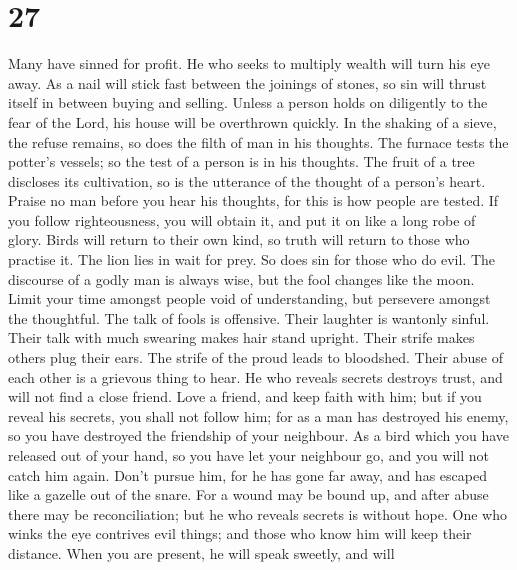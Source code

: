 \hypertarget{section-23}{%
\section{27}\label{section-23}}

 Many have sinned for profit. He who seeks to multiply
wealth will turn his eye away.  As a nail will stick fast
between the joinings of stones, so sin will thrust itself in between
buying and selling.  Unless a person holds on diligently to
the fear of the Lord, his house will be overthrown quickly. 
In the shaking of a sieve, the refuse remains, so does the filth of man
in his thoughts.  The furnace tests the potter's vessels; so
the test of a person is in his thoughts.  The fruit of a
tree discloses its cultivation, so is the utterance of the thought of a
person's heart.  Praise no man before you hear his thoughts,
for this is how people are tested.  If you follow
righteousness, you will obtain it, and put it on like a long robe of
glory.  Birds will return to their own kind, so truth will
return to those who practise it.  The lion lies in wait for
prey. So does sin for those who do evil.  The discourse of
a godly man is always wise, but the fool changes like the moon.
 Limit your time amongst people void of understanding, but
persevere amongst the thoughtful.  The talk of fools is
offensive. Their laughter is wantonly sinful.  Their talk
with much swearing makes hair stand upright. Their strife makes others
plug their ears.  The strife of the proud leads to
bloodshed. Their abuse of each other is a grievous thing to hear.
 He who reveals secrets destroys trust, and will not find a
close friend.  Love a friend, and keep faith with him; but
if you reveal his secrets, you shall not follow him;  for
as a man has destroyed his enemy, so you have destroyed the friendship
of your neighbour.  As a bird which you have released out
of your hand, so you have let your neighbour go, and you will not catch
him again.  Don't pursue him, for he has gone far away, and
has escaped like a gazelle out of the snare.  For a wound
may be bound up, and after abuse there may be reconciliation; but he who
reveals secrets is without hope.  One who winks the eye
contrives evil things; and those who know him will keep their distance.
 When you are present, he will speak sweetly, and will
